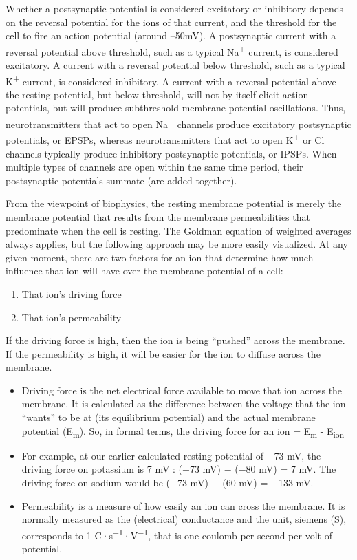 \documentclass[]{book}
\providecommand{\tightlist}{%
  \setlength{\itemsep}{0pt}\setlength{\parskip}{0pt}}
\begin{document}
Whether a postsynaptic potential is considered excitatory or inhibitory depends on the reversal potential for the ions of that current, and the threshold for the cell to fire an action potential (around --50mV). A postsynaptic current with a reversal potential above threshold, such as a typical Na\textsuperscript{+} current, is considered excitatory. A current with a reversal potential below threshold, such as a typical K\textsuperscript{+} current, is considered inhibitory. A current with a reversal potential above the resting potential, but below threshold, will not by itself elicit action potentials, but will produce subthreshold membrane potential oscillations. Thus, neurotransmitters that act to open Na\textsuperscript{+} channels produce excitatory postsynaptic potentials, or EPSPs, whereas neurotransmitters that act to open K\textsuperscript{+} or Cl\textsuperscript{−} channels typically produce inhibitory postsynaptic potentials, or IPSPs. When multiple types of channels are open within the same time period, their postsynaptic potentials summate (are added together).

From the viewpoint of biophysics, the resting membrane potential is merely the membrane potential that results from the membrane permeabilities that predominate when the cell is resting. The Goldman equation of weighted averages always applies, but the following approach may be more easily visualized. At any given moment, there are two factors for an ion that determine how much influence that ion will have over the membrane potential of a cell:

\begin{enumerate}
\def\labelenumi{\arabic{enumi}.}
\tightlist
\item
  That ion's driving force
\item
  That ion's permeability
\end{enumerate}

If the driving force is high, then the ion is being ``pushed'' across the membrane. If the permeability is high, it will be easier for the ion to diffuse across the membrane.

\begin{itemize}
\tightlist
\item
  Driving force is the net electrical force available to move that ion across the membrane. It is calculated as the difference between the voltage that the ion ``wants'' to be at (its equilibrium potential) and the actual membrane potential (E\textsubscript{m}). So, in formal terms, the driving force for an ion = E\textsubscript{m} - E\textsubscript{ion}
\item
  For example, at our earlier calculated resting potential of −73 mV, the driving force on potassium is 7 mV : (−73 mV) − (−80 mV) = 7 mV. The driving force on sodium would be (−73 mV) − (60 mV) = −133 mV.
\item
  Permeability is a measure of how easily an ion can cross the membrane. It is normally measured as the (electrical) conductance and the unit, siemens (S), corresponds to 1 C·s\textsuperscript{−1}·V\textsuperscript{−1}, that is one coulomb per second per volt of potential.
\end{itemize}
\end{document}
